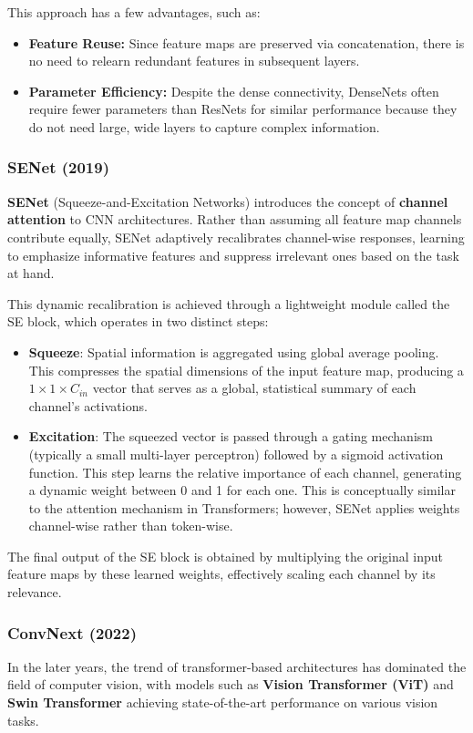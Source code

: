 This approach has a few advantages, such as:
\begin{itemize}
    \item \textbf{Feature Reuse:} Since feature maps are preserved via concatenation, there is no need to relearn redundant features in subsequent layers.
    \item \textbf{Parameter Efficiency:} Despite the dense connectivity, DenseNets often require fewer parameters than ResNets for similar performance because they do not need large, wide layers to capture complex information.
\end{itemize}

\subsubsection{SENet (2019)}
\textbf{SENet} (Squeeze-and-Excitation Networks) introduces the concept of \textbf{channel attention} to CNN architectures. 
Rather than assuming all feature map channels contribute equally, SENet adaptively recalibrates channel-wise responses, learning to emphasize informative features and suppress irrelevant ones based on the task at hand.

This dynamic recalibration is achieved through a lightweight module called the SE block, which operates in two distinct steps:
\begin{itemize}
    \item \textbf{Squeeze}: Spatial information is aggregated using global average pooling. This compresses the spatial dimensions of the input feature map, producing a $1 \times 1 \times C_{in}$ vector that serves as a global, statistical summary of each channel's activations.
    
    \item \textbf{Excitation}: The squeezed vector is passed through a gating mechanism (typically a small multi-layer perceptron) followed by a sigmoid activation function. This step learns the relative importance of each channel, generating a dynamic weight between 0 and 1 for each one. This is conceptually similar to the attention mechanism in Transformers; however, SENet applies weights channel-wise rather than token-wise.
\end{itemize}

The final output of the SE block is obtained by multiplying the original input feature maps by these learned weights, effectively scaling each channel by its relevance.

\subsubsection{ConvNext (2022)}
In the later years, the trend of transformer-based architectures has dominated the field of computer vision, with models such as \textbf{Vision Transformer (ViT)} and \textbf{Swin Transformer} 
achieving state-of-the-art performance on various vision tasks.

